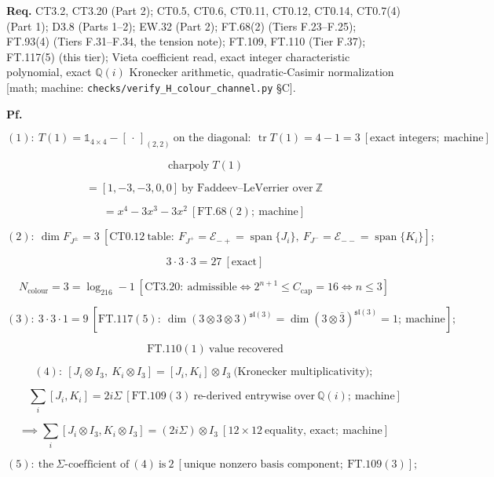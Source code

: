 \begin{theorem}
\textbf{Req.} CT3.2, CT3.20 (Part 2); CT0.5, CT0.6, CT0.11, CT0.12, CT0.14, CT0.7(4) (Part 1); D3.8 (Parts 1–2); EW.32 (Part 2); FT.68(2) (Tiers F.23–F.25); FT.93(4) (Tiers F.31–F.34, the tension note); FT.109, FT.110 (Tier F.37); FT.117(5) (this tier); Vieta coefficient read, exact integer characteristic polynomial, exact $\mathbb Q(i)$ Kronecker arithmetic, quadratic-Casimir normalization [math; machine: \texttt{checks/\allowbreak{}verify\_\allowbreak{}H\_\allowbreak{}colour\_\allowbreak{}channel.py} §C].

\textbf{Pf.}

\[
(1):\ T(1)=\mathbb 1_{4\times4}-[\,\cdot\,]_{(2,2)}\ \text{on the diagonal}:\ \operatorname{tr}T(1)=4-1=3\ [\text{exact integers};\ \text{machine}]
\]

\[
\operatorname{charpoly}T(1)
\]

\[
= [1,-3,-3,0,0]\ \text{by Faddeev–LeVerrier over}\ \mathbb Z
\]

\[
= x^4-3x^3-3x^2\ [\mathrm{FT.68}(2);\ \text{machine}]
\]

\[
(2):\ \dim F_{J^\pm}=3\ [\mathrm{CT0.12}\ \text{table}:\ F_{J^+}=\mathcal E_{-+}=\operatorname{span}\{J_i\},\ F_{J^-}=\mathcal E_{--}=\operatorname{span}\{K_i\}];
\]

\[
\qquad 3\cdot3\cdot3=27\ [\text{exact}]
\]

\[
N_{\text{colour}}=3=\log_216-1\ [\mathrm{CT3.20}:\ \text{admissible}\iff2^{n+1}\le C_{\mathrm{cap}}=16\iff n\le3]
\]

\[
(3):\ 3\cdot3\cdot1=9\ [\mathrm{FT.117}(5):\ \dim(3\otimes3\otimes3)^{\mathfrak{sl}(3)}=\dim(3\otimes\bar3)^{\mathfrak{sl}(3)}=1;\ \text{machine}];
\]

\[
\qquad \mathrm{FT.110}(1)\ \text{value recovered}
\]

\[
(4):\ [J_i\otimes I_3,\ K_i\otimes I_3]=[J_i,K_i]\otimes I_3\ \text{(Kronecker multiplicativity)};
\]

\[
\qquad \sum_i[J_i,K_i]=2i\Sigma\ [\mathrm{FT.109}(3)\ \text{re-derived entrywise over}\ \mathbb Q(i);\ \text{machine}]
\]

\[
\implies\sum_i[J_i\otimes I_3,K_i\otimes I_3]=(2i\Sigma)\otimes I_3\ [12\times12\ \text{equality, exact};\ \text{machine}]
\]

\[
(5):\ \text{the}\ \Sigma\text{-coefficient of}\ (4)\ \text{is}\ 2\ [\text{unique nonzero basis component};\ \mathrm{FT.109}(3)];
\]


\end{theorem}

